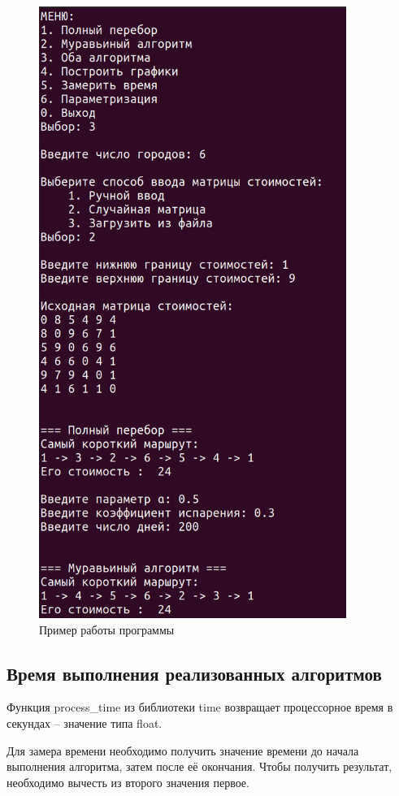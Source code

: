 \begin{figure}[!h]
	\centering
	\includegraphics[width=100mm]{images/example}
	\caption{Пример работы программы}
	\label{img:example}
\end{figure}

\pagebreak
\newpage
\subsection{Время выполнения реализованных алгоритмов}
Функция process\_time из библиотеки time возвращает  процессорное время в секундах -- значение типа float.

Для замера времени необходимо получить значение времени до начала выполнения алгоритма, затем после её окончания. Чтобы получить результат, необходимо вычесть из второго значения первое.

